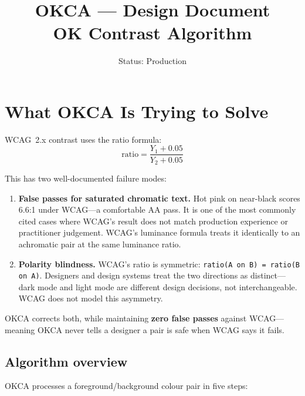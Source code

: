 \documentclass[11pt,a4paper]{article}
\title{\textbf{OKCA --- Design Document}\\[0.3em]
       \large OK Contrast Algorithm}
\author{}
\date{Status: Production}
\begin{document}
\maketitle
\tableofcontents
\newpage

\section{What OKCA Is Trying to Solve}

WCAG~2.x contrast uses the ratio formula:
\[
  \text{ratio} = \frac{Y_1 + 0.05}{Y_2 + 0.05}
\]

This has two well-documented failure modes:

\begin{enumerate}
  \item \textbf{False passes for saturated chromatic text.}
    Hot pink on near-black scores 6.6:1 under WCAG---a comfortable AA
    pass.  It is one of the most commonly cited cases where WCAG's result
    does not match production experience or practitioner judgement.
    WCAG's luminance formula treats it identically to an achromatic pair
    at the same luminance ratio.

  \item \textbf{Polarity blindness.}
    WCAG's ratio is symmetric: \texttt{ratio(A on B) = ratio(B on A)}.
    Designers and design systems treat the two directions as
    distinct---dark mode and light mode are different design decisions,
    not interchangeable.  WCAG does not model this asymmetry.
\end{enumerate}

OKCA corrects both, while maintaining \textbf{zero false passes}
against WCAG---meaning OKCA never tells a designer a pair is safe
when WCAG says it fails.

\subsection*{Algorithm overview}

OKCA processes a foreground/background colour pair in five steps:
\end{document}
